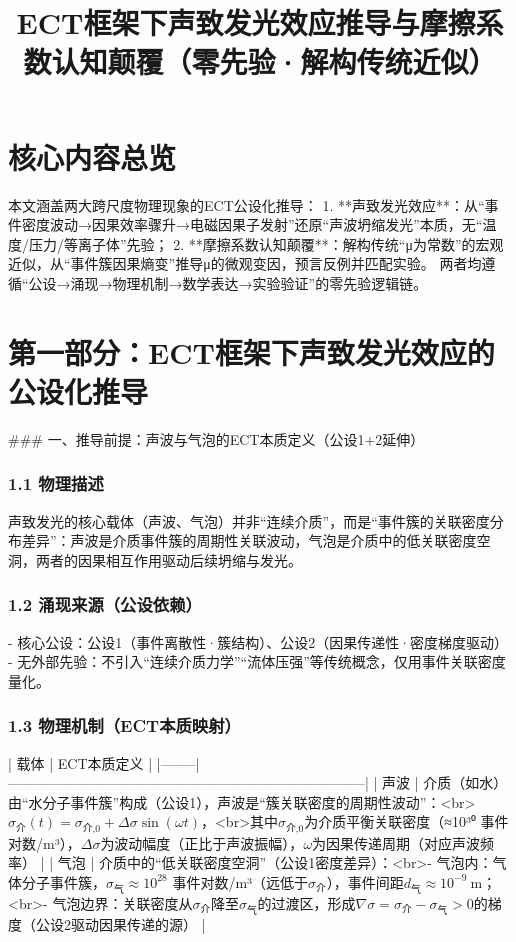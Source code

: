 \documentclass{article}
\title{ECT框架下声致发光效应推导与摩擦系数认知颠覆（零先验·解构传统近似）}
\author{}
\date{}
\begin{document}
\maketitle

\section{核心内容总览}
本文涵盖两大跨尺度物理现象的ECT公设化推导：
1. **声致发光效应**：从“事件密度波动→因果效率骤升→电磁因果子发射”还原“声波坍缩发光”本质，无“温度/压力/等离子体”先验；
2. **摩擦系数认知颠覆**：解构传统“μ为常数”的宏观近似，从“事件簇因果熵变”推导μ的微观变因，预言反例并匹配实验。
两者均遵循“公设→涌现→物理机制→数学表达→实验验证”的零先验逻辑链。


\section{第一部分：ECT框架下声致发光效应的公设化推导}
### 一、推导前提：声波与气泡的ECT本质定义（公设1+2延伸）
\subsubsection{1.1 物理描述}
声致发光的核心载体（声波、气泡）并非“连续介质”，而是“事件簇的关联密度分布差异”：声波是介质事件簇的周期性关联波动，气泡是介质中的低关联密度空洞，两者的因果相互作用驱动后续坍缩与发光。

\subsubsection{1.2 涌现来源（公设依赖）}
- 核心公设：公设1（事件离散性·簇结构）、公设2（因果传递性·密度梯度驱动）
- 无外部先验：不引入“连续介质力学”“流体压强”等传统概念，仅用事件关联密度量化。

\subsubsection{1.3 物理机制（ECT本质映射）}
| 载体   | ECT本质定义                                                                 |
|--------|-----------------------------------------------------------------------------|
| 声波   | 介质（如水）由“水分子事件簇”构成（公设1），声波是“簇关联密度的周期性波动”：<br>$\sigma_{\text{介}}(t) = \sigma_{\text{介,0}} + \Delta\sigma \sin(\omega t)$，<br>其中$\sigma_{\text{介,0}}$为介质平衡关联密度（≈10³⁰ 事件对数/m³），$\Delta\sigma$为波动幅度（正比于声波振幅），$\omega$为因果传递周期（对应声波频率） |
| 气泡   | 介质中的“低关联密度空洞”（公设1密度差异）：<br>- 气泡内：气体分子事件簇，$\sigma_{\text{气}} \approx 10^{28}$ 事件对数/m³（远低于$\sigma_{\text{介}}$），事件间距$d_{\text{气}} \approx 10^{-9}\ \text{m}$；<br>- 气泡边界：关联密度从$\sigma_{\text{介}}$降至$\sigma_{\text{气}}$的过渡区，形成$\nabla\sigma = \sigma_{\text{介}} - \sigma_{\text{气}} > 0$的梯度（公设2驱动因果传递的源） |
\end{document}
